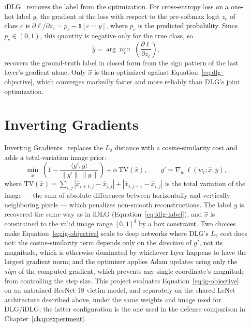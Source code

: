 iDLG~\cite{zhao2020idlg} removes the label from the optimization. For
cross-entropy loss on a one-hot label $y$, the gradient of the loss with
respect to the pre-softmax logit $z_c$ of class $c$ is $\partial \ell/\partial z_c = p_c - \mathbb{1}[c = y]$,
where $p_c$ is the predicted probability. Since $p_c \in (0,1)$, this
quantity is negative only for the true class, so
\begin{equation}
\hat{y} = \arg\min_{c} \; \left(\frac{\partial \ell}{\partial z_c}\right),
\label{eq:idlg-label}
\end{equation}
recovers the ground-truth label in closed form from the sign pattern of the
last layer's gradient alone. Only $\hat{x}$ is then optimized against
Equation~\eqref{eq:dlg-objective}, which converges markedly faster and more
reliably than DLG's joint optimization.

\section{Inverting Gradients}
\label{sec:inverting-gradients}

Inverting Gradients~\cite{geiping2020inverting} replaces the $L_2$ distance
with a cosine-similarity cost and adds a total-variation image prior:
\begin{equation}
\min_{\hat{x}} \; \left(1 - \frac{\langle g', g \rangle}{\lVert g' \rVert \, \lVert g \rVert}\right)
+ \alpha \, \mathrm{TV}(\hat{x}), \qquad g' = \nabla_w \, \ell(w_t; \hat{x}, y),
\label{eq:ig-objective}
\end{equation}
where $\mathrm{TV}(\hat{x}) = \sum_{i,j} |\hat{x}_{i+1,j} - \hat{x}_{i,j}| + |\hat{x}_{i,j+1} - \hat{x}_{i,j}|$
is the total variation of the image --- the sum of absolute differences
between horizontally and vertically neighboring pixels --- which penalizes
non-smooth reconstructions. The label $y$ is recovered the same way as in
iDLG (Equation~\eqref{eq:idlg-label}), and $\hat{x}$ is constrained to the
valid image range $[0,1]^d$ by a box constraint. Two choices make
Equation~\eqref{eq:ig-objective} scale to deep networks where DLG's $L_2$
cost does not: the cosine-similarity term depends only on the
\emph{direction} of $g'$, not its magnitude, which is otherwise dominated
by whichever layer happens to have the largest gradient norm; and the
optimizer applies Adam updates using only the \emph{sign} of the computed
gradient, which prevents any single coordinate's magnitude from
controlling the step size. This project evaluates Equation~\eqref{eq:ig-objective}
on an untrained ResNet-18 victim model, and separately on the shared LeNet
architecture described above, under the same weights
and image used for DLG/iDLG; the latter configuration is the one used in
the defense comparison in Chapter~\ref{chap:experiment}.

